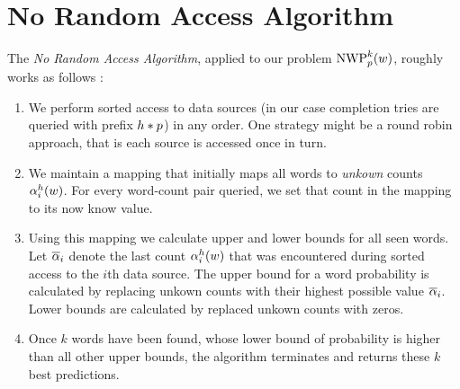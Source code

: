\section{No Random Access Algorithm}
\label{sec:norandomaccessalgorithm}

The \emph{No Random Access Algorithm}, applied to our problem $\NWP[p][k](w)$,
roughly works as follows \parencite{Fagin2001}:
\begin{enumerate}
  \item We perform sorted access to data sources (in our case completion tries
    are queried with prefix $h * p$) in any order.
    One strategy might be a round robin approach, that is each source is
    accessed once in turn.
  \item We maintain a mapping that initially maps all words to \emph{unkown}
    counts $\alpha^h_i(w)$.
    For every word-count pair queried, we set that count in the mapping to its
    now know value.
  \item Using this mapping we calculate upper and lower bounds for all seen
    words.
    Let $\overline{\alpha}_i$ denote the last count $\alpha^h_i(w)$ that
    was encountered during sorted access to the $i$th data source.
    The upper bound for a word probability is calculated by replacing unkown
    counts with their highest possible value $\overline{\alpha}_i$.
    Lower bounds are calculated by replaced unkown counts with zeros.
  \item Once $k$ words have been found, whose lower bound of probability is
    higher than all other upper bounds, the algorithm terminates and returns
    these $k$ best predictions.
\end{enumerate}

